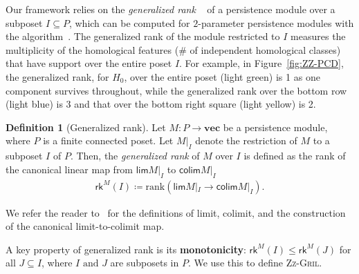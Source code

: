 \documentclass{article}
\newcommand{\zzgril}{\textsc{Zz-Gril}}
\newcommand{\RKG}{\mathsf{rk}}
\renewcommand{\varprojlim}{\mathsf{lim}}
\renewcommand{\varinjlim}{\mathsf{colim}}
\theoremstyle{plain}
\theoremstyle{definition}
\newtheorem{definition}[theorem]{Definition}
\theoremstyle{remark}
\begin{document}
Our framework relies on the \emph{generalized rank}
~\cite{GenRankKim21} of a persistence module over a subposet $I \subseteq P$, which can be computed for $2$-parameter persistence modules with the algorithm~\cite{DKM24}. The generalized
rank of the module restricted to $I$ measures the multiplicity of the homological
features (\# of independent homological classes) that have support over the entire poset $I$. For example, in Figure~\ref{fig:ZZ-PCD}, the generalized rank, for $H_0$, over the entire poset (light green) is 1 as one component survives throughout, while the generalized rank over the bottom row (light blue) is 3 and that over the bottom right square (light yellow) is 2. 
\begin{definition}[Generalized rank]
    Let $M :P \to \mathbf{vec}$ be a persistence module, where $P$ is a finite connected poset. Let $M|_I$ denote the restriction of $M$ to a subposet $I$ of $P$. Then, the \emph{generalized rank} of $M$ over $I$ is defined as the rank of the canonical linear map from $\varprojlim M|_I$ to $\varinjlim M|_I$
    \begin{eqnarray*}
        \RKG^M(I) \coloneqq \text{rank} \left ( \varprojlim M|_I \to \varinjlim M|_I \right ).
    \end{eqnarray*}
\end{definition}
 We refer the reader to~\cite{Saunders_Maclane_Cat_Theory} for the definitions of limit, colimit, and the construction of the canonical limit-to-colimit map.

A key property of generalized rank is its \textbf{monotonicity}: $\RKG^M(I) \leq \RKG^M(J)$ for all $J \subseteq I$, where $I \text{ and } J$ are subposets in $P$. We use this to define \zzgril{}.

\end{document}
